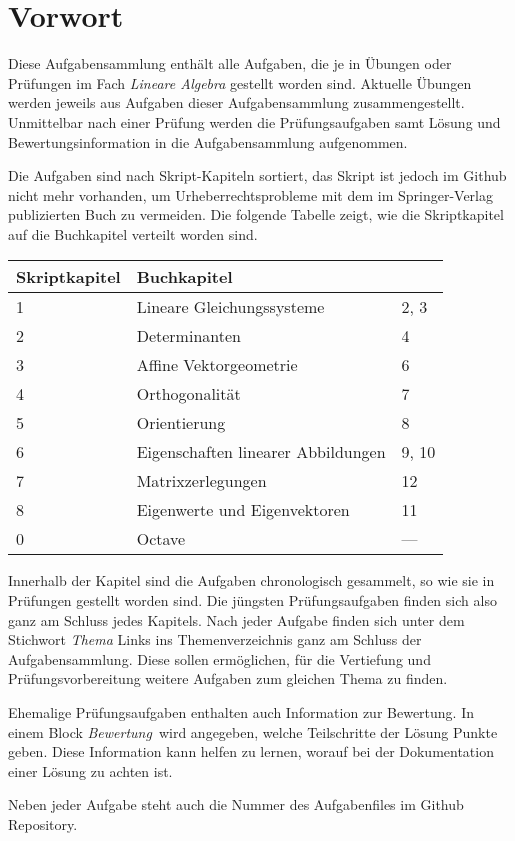 %
%
%
\chapter*{Vorwort}
Diese Aufgabensammlung enthält alle Aufgaben, die je in Übungen oder
Prüfungen im Fach {\em Lineare Algebra} gestellt worden sind.
Aktuelle Übungen werden jeweils aus Aufgaben dieser Aufgabensammlung
zusammengestellt.
Unmittelbar nach einer Prüfung werden die Prüfungsaufgaben samt
Lösung und Bewertungsinformation in die Aufgabensammlung aufgenommen.

Die Aufgaben sind nach Skript-Kapiteln sortiert, das Skript ist
jedoch im Github nicht mehr vorhanden, um Urheberrechtsprobleme
mit dem im Springer-Verlag publizierten Buch zu vermeiden.
Die folgende Tabelle zeigt, wie die Skriptkapitel auf die Buchkapitel
verteilt worden sind.
\begin{center}
\begin{tabular}{lll}
\hline
Skriptkapitel &Buchkapitel \\
\hline
1 &Lineare Gleichungssysteme         &  2, 3       \\
2 &Determinanten                     &  4          \\
3 &Affine Vektorgeometrie            &  6          \\
4 &Orthogonalität                    &  7          \\
5 &Orientierung                      &  8          \\
6 &Eigenschaften linearer Abbildungen&  9, 10      \\
7 &Matrixzerlegungen                 &  12         \\
8 &Eigenwerte und Eigenvektoren      &  11         \\
0 &Octave                            &  ---	   \\
\hline
\end{tabular}
\end{center}
Innerhalb der Kapitel sind die Aufgaben chronologisch gesammelt,
so wie sie in Prüfungen gestellt worden sind.
Die jüngsten Prüfungsaufgaben finden sich also ganz am Schluss jedes
Kapitels.
Nach jeder Aufgabe finden sich unter dem Stichwort {\em Thema} Links
ins Themenverzeichnis ganz am Schluss der Aufgabensammlung.
Diese sollen ermöglichen, für die Vertiefung und Prüfungsvorbereitung
weitere Aufgaben zum gleichen Thema zu finden.

Ehemalige Prüfungsaufgaben enthalten auch Information zur Bewertung.
In einem Block {\em Bewertung} wird angegeben, welche Teilschritte
der Lösung Punkte geben.
Diese Information kann helfen zu lernen, worauf bei der Dokumentation
einer Lösung zu achten ist.

Neben jeder Aufgabe steht auch die Nummer des Aufgabenfiles im
Github Repository.

